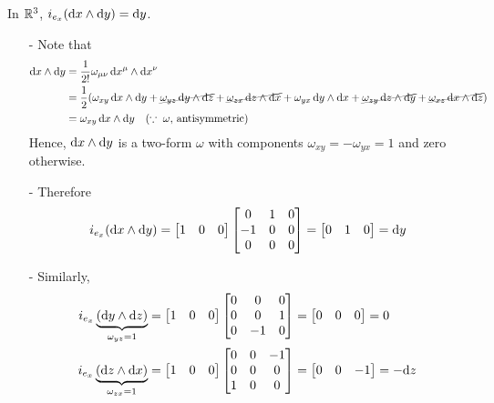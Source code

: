 \documentclass[a4paper, 10pt]{article}
\begin{document}
\begin{example}
    In $\mathbb{R}^{3}$, $i_{e_{x}}(\mathrm{d}{x}\wedge\mathrm{d}{y}) = \mathrm{d}{y}$.
    \begin{itemize}
        \item[-] Note that
        \begin{align*}
            \mathrm{d}{x} \wedge \mathrm{d}{y} &= \frac{1}{2!}\omega_{\mu\nu} \, \mathrm{d}{x}^{\mu} \wedge \mathrm{d}{x}^{\nu} \\
            &= \frac{1}{2}(\omega_{xy}\,\mathrm{d}{x}\wedge\mathrm{d}{y} + \cancel{\omega_{yz}\,\mathrm{d}{y}\wedge\mathrm{d}{z}} + \cancel{\omega_{zx}\,\mathrm{d}{z}\wedge\mathrm{d}{x}} + \omega_{yx}\,\mathrm{d}{y}\wedge\mathrm{d}{x} + \cancel{\omega_{zy}\,\mathrm{d}{z}\wedge\mathrm{d}{y}} + \cancel{\omega_{xz}\,\mathrm{d}{x}\wedge\mathrm{d}{z}}) \\
            &= \omega_{xy}\,\mathrm{d}{x}\wedge\mathrm{d}{y} \quad (\because \; \omega, \, \text{antisymmetric})
        \end{align*}
        Hence, $\mathrm{d}{x}\wedge\mathrm{d}{y}$ is a two-form $\omega$ with components $\omega_{xy}=-\omega_{yx}=1$ and zero otherwise.
        \item[-] Therefore
        \[ i_{e_{x}}(\mathrm{d}{x}\wedge\mathrm{d}{y}) = \begin{bmatrix}1 & 0 & 0\end{bmatrix}\begin{bmatrix}0 & 1 & 0 \\ -1 & 0 & 0 \\ 0 & 0 & 0\end{bmatrix} = \begin{bmatrix}0 & 1 & 0\end{bmatrix} = \mathrm{d}{y} \]
        \item[-] Similarly,
        \begin{align*}
            i_{e_{x}}\underbrace{(\mathrm{d}{y}\wedge\mathrm{d}{z})}_{\omega_{yz} = 1} &= \begin{bmatrix}1 & 0 & 0\end{bmatrix}\begin{bmatrix}0 & 0 & 0 \\ 0 & 0 & 1 \\ 0 & -1 & 0\end{bmatrix} = \begin{bmatrix}0 & 0 & 0\end{bmatrix} = 0 \\
            i_{e_{x}}\underbrace{(\mathrm{d}{z}\wedge\mathrm{d}{x})}_{\omega_{zx} = 1} &= \begin{bmatrix}1 & 0 & 0\end{bmatrix}\begin{bmatrix}0 & 0 & -1 \\ 0 & 0 & 0 \\ 1 & 0 & 0\end{bmatrix} = \begin{bmatrix}0 & 0 & -1\end{bmatrix} = -\mathrm{d}{z}
        \end{align*}
    \end{itemize}
\end{example}
\end{document}
